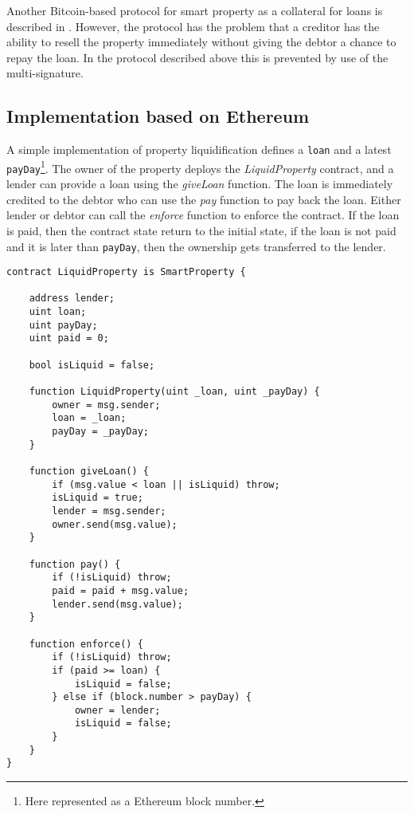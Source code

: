 Another Bitcoin-based protocol for smart property as a collateral for loans is described in \cite{smartproperty2011}. However, the protocol has the problem that a creditor has the ability to resell the property immediately without giving the debtor a chance to repay the loan. In the protocol described above this is prevented by use of the multi-signature. 

\subsection{Implementation based on Ethereum}

A simple implementation of property liquidification defines a \texttt{loan} and a latest \texttt{payDay}\footnote{Here represented as a Ethereum block number.}. The owner of the property deploys the \emph{LiquidProperty} contract, and a lender can provide a loan using the \emph{giveLoan} function. The loan is immediately credited to the debtor who can use the \emph{pay} function to pay back the loan. Either lender or debtor can call the \emph{enforce} function to enforce the contract. If the loan is paid, then the contract state return to the initial state, if the loan is not paid and it is later than \texttt{payDay}, then the ownership gets transferred to the lender.

\begin{lstlisting}[breaklines,basicstyle=\tiny]
contract LiquidProperty is SmartProperty {
    
    address lender;
    uint loan;
    uint payDay;
    uint paid = 0;
    
    bool isLiquid = false;
    
    function LiquidProperty(uint _loan, uint _payDay) {
        owner = msg.sender;
        loan = _loan;
        payDay = _payDay;
    }
    
    function giveLoan() {
        if (msg.value < loan || isLiquid) throw;
        isLiquid = true;
        lender = msg.sender;
        owner.send(msg.value);
    }
    
    function pay() {
        if (!isLiquid) throw;
        paid = paid + msg.value;
        lender.send(msg.value);
    }
    
    function enforce() {
        if (!isLiquid) throw;
        if (paid >= loan) {
            isLiquid = false;
        } else if (block.number > payDay) {
            owner = lender;
            isLiquid = false;
        }
    }
}
\end{lstlisting}